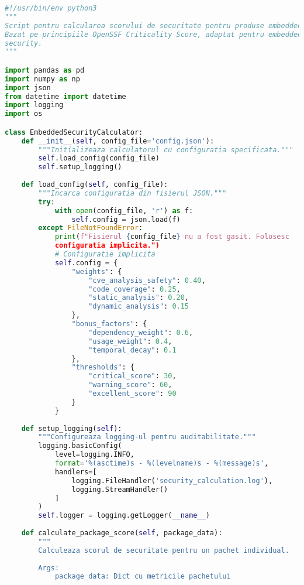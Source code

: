\documentclass[12pt,a4paper]{article}
\begin{document}
\begin{lstlisting}[language=Python, caption=Script real pentru calcularea scorului de securitate (security\_calculator.py), label=lst:real_security_calculator]
#!/usr/bin/env python3
"""
Script pentru calcularea scorului de securitate pentru produse embedded.
Bazat pe principiile OpenSSF Criticality Score, adaptat pentru embedded 
security.
"""

import pandas as pd
import numpy as np
import json
from datetime import datetime
import logging
import os

class EmbeddedSecurityCalculator:
    def __init__(self, config_file='config.json'):
        """Initializeaza calculatorul cu configuratia specificata."""
        self.load_config(config_file)
        self.setup_logging()
        
    def load_config(self, config_file):
        """Incarca configuratia din fisierul JSON."""
        try:
            with open(config_file, 'r') as f:
                self.config = json.load(f)
        except FileNotFoundError:
            print(f"Fisierul {config_file} nu a fost gasit. Folosesc 
            configuratia implicita.")
            # Configuratie implicita
            self.config = {
                "weights": {
                    "cve_analysis_safety": 0.40,
                    "code_coverage": 0.25,
                    "static_analysis": 0.20,
                    "dynamic_analysis": 0.15
                },
                "bonus_factors": {
                    "dependency_weight": 0.6,
                    "usage_weight": 0.4,
                    "temporal_decay": 0.1
                },
                "thresholds": {
                    "critical_score": 30,
                    "warning_score": 60,
                    "excellent_score": 90
                }
            }
    
    def setup_logging(self):
        """Configureaza logging-ul pentru auditabilitate."""
        logging.basicConfig(
            level=logging.INFO,
            format='%(asctime)s - %(levelname)s - %(message)s',
            handlers=[
                logging.FileHandler('security_calculation.log'),
                logging.StreamHandler()
            ]
        )
        self.logger = logging.getLogger(__name__)
    
    def calculate_package_score(self, package_data):
        """
        Calculeaza scorul de securitate pentru un pachet individual.
        
        Args:
            package_data: Dict cu metricile pachetului
            

\end{lstlisting}
\end{document}
